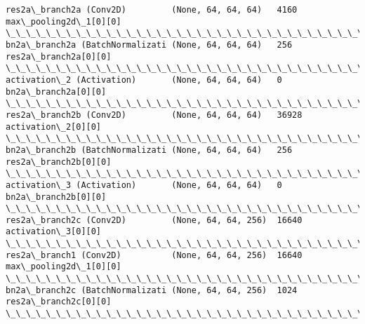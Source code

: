 \documentclass[11pt]{article}
\begin{document}
\begin{Verbatim}[commandchars=\\\{\}]
res2a\_branch2a (Conv2D)         (None, 64, 64, 64)   4160        max\_pooling2d\_1[0][0]            
\_\_\_\_\_\_\_\_\_\_\_\_\_\_\_\_\_\_\_\_\_\_\_\_\_\_\_\_\_\_\_\_\_\_\_\_\_\_\_\_\_\_\_\_\_\_\_\_\_\_\_\_\_\_\_\_\_\_\_\_\_\_\_\_\_\_\_\_\_\_\_\_\_\_\_\_\_\_\_\_\_\_\_\_\_\_\_\_\_\_\_\_\_\_\_\_\_\_
bn2a\_branch2a (BatchNormalizati (None, 64, 64, 64)   256         res2a\_branch2a[0][0]             
\_\_\_\_\_\_\_\_\_\_\_\_\_\_\_\_\_\_\_\_\_\_\_\_\_\_\_\_\_\_\_\_\_\_\_\_\_\_\_\_\_\_\_\_\_\_\_\_\_\_\_\_\_\_\_\_\_\_\_\_\_\_\_\_\_\_\_\_\_\_\_\_\_\_\_\_\_\_\_\_\_\_\_\_\_\_\_\_\_\_\_\_\_\_\_\_\_\_
activation\_2 (Activation)       (None, 64, 64, 64)   0           bn2a\_branch2a[0][0]              
\_\_\_\_\_\_\_\_\_\_\_\_\_\_\_\_\_\_\_\_\_\_\_\_\_\_\_\_\_\_\_\_\_\_\_\_\_\_\_\_\_\_\_\_\_\_\_\_\_\_\_\_\_\_\_\_\_\_\_\_\_\_\_\_\_\_\_\_\_\_\_\_\_\_\_\_\_\_\_\_\_\_\_\_\_\_\_\_\_\_\_\_\_\_\_\_\_\_
res2a\_branch2b (Conv2D)         (None, 64, 64, 64)   36928       activation\_2[0][0]               
\_\_\_\_\_\_\_\_\_\_\_\_\_\_\_\_\_\_\_\_\_\_\_\_\_\_\_\_\_\_\_\_\_\_\_\_\_\_\_\_\_\_\_\_\_\_\_\_\_\_\_\_\_\_\_\_\_\_\_\_\_\_\_\_\_\_\_\_\_\_\_\_\_\_\_\_\_\_\_\_\_\_\_\_\_\_\_\_\_\_\_\_\_\_\_\_\_\_
bn2a\_branch2b (BatchNormalizati (None, 64, 64, 64)   256         res2a\_branch2b[0][0]             
\_\_\_\_\_\_\_\_\_\_\_\_\_\_\_\_\_\_\_\_\_\_\_\_\_\_\_\_\_\_\_\_\_\_\_\_\_\_\_\_\_\_\_\_\_\_\_\_\_\_\_\_\_\_\_\_\_\_\_\_\_\_\_\_\_\_\_\_\_\_\_\_\_\_\_\_\_\_\_\_\_\_\_\_\_\_\_\_\_\_\_\_\_\_\_\_\_\_
activation\_3 (Activation)       (None, 64, 64, 64)   0           bn2a\_branch2b[0][0]              
\_\_\_\_\_\_\_\_\_\_\_\_\_\_\_\_\_\_\_\_\_\_\_\_\_\_\_\_\_\_\_\_\_\_\_\_\_\_\_\_\_\_\_\_\_\_\_\_\_\_\_\_\_\_\_\_\_\_\_\_\_\_\_\_\_\_\_\_\_\_\_\_\_\_\_\_\_\_\_\_\_\_\_\_\_\_\_\_\_\_\_\_\_\_\_\_\_\_
res2a\_branch2c (Conv2D)         (None, 64, 64, 256)  16640       activation\_3[0][0]               
\_\_\_\_\_\_\_\_\_\_\_\_\_\_\_\_\_\_\_\_\_\_\_\_\_\_\_\_\_\_\_\_\_\_\_\_\_\_\_\_\_\_\_\_\_\_\_\_\_\_\_\_\_\_\_\_\_\_\_\_\_\_\_\_\_\_\_\_\_\_\_\_\_\_\_\_\_\_\_\_\_\_\_\_\_\_\_\_\_\_\_\_\_\_\_\_\_\_
res2a\_branch1 (Conv2D)          (None, 64, 64, 256)  16640       max\_pooling2d\_1[0][0]            
\_\_\_\_\_\_\_\_\_\_\_\_\_\_\_\_\_\_\_\_\_\_\_\_\_\_\_\_\_\_\_\_\_\_\_\_\_\_\_\_\_\_\_\_\_\_\_\_\_\_\_\_\_\_\_\_\_\_\_\_\_\_\_\_\_\_\_\_\_\_\_\_\_\_\_\_\_\_\_\_\_\_\_\_\_\_\_\_\_\_\_\_\_\_\_\_\_\_
bn2a\_branch2c (BatchNormalizati (None, 64, 64, 256)  1024        res2a\_branch2c[0][0]             
\_\_\_\_\_\_\_\_\_\_\_\_\_\_\_\_\_\_\_\_\_\_\_\_\_\_\_\_\_\_\_\_\_\_\_\_\_\_\_\_\_\_\_\_\_\_\_\_\_\_\_\_\_\_\_\_\_\_\_\_\_\_\_\_\_\_\_\_\_\_\_\_\_\_\_\_\_\_\_\_\_\_\_\_\_\_\_\_\_\_\_\_\_\_\_\_\_\_

\end{Verbatim}
\end{document}
